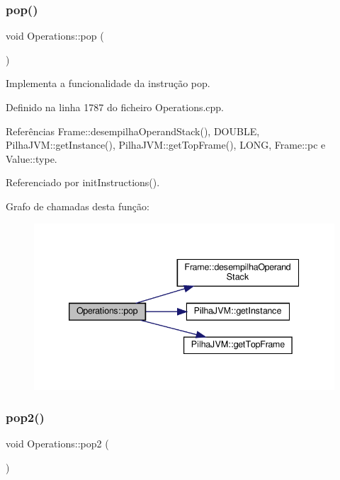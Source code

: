 \mbox{\label{classOperations_a30b8a646cbfac3712f4b339364bd31b1}} 
\subsubsection{\texorpdfstring{pop()}{pop()}}
{\footnotesize\ttfamily void Operations\+::pop (\begin{DoxyParamCaption}{ }\end{DoxyParamCaption})\hspace{0.3cm}{\ttfamily [private]}}



Implementa a funcionalidade da instrução pop. 



Definido na linha 1787 do ficheiro Operations.\+cpp.



Referências Frame\+::desempilha\+Operand\+Stack(), D\+O\+U\+B\+LE, Pilha\+J\+V\+M\+::get\+Instance(), Pilha\+J\+V\+M\+::get\+Top\+Frame(), L\+O\+NG, Frame\+::pc e Value\+::type.



Referenciado por init\+Instructions().

Grafo de chamadas desta função\+:
\nopagebreak
\begin{figure}[H]
\begin{center}
\leavevmode
\includegraphics[width=339pt]{classOperations_a30b8a646cbfac3712f4b339364bd31b1_cgraph}
\end{center}
\end{figure}
\mbox{\label{classOperations_a54e578f7f27df39f8c516ec93195e219}} 
\subsubsection{\texorpdfstring{pop2()}{pop2()}}
{\footnotesize\ttfamily void Operations\+::pop2 (\begin{DoxyParamCaption}{ }\end{DoxyParamCaption})\hspace{0.3cm}{\ttfamily [private]}}



